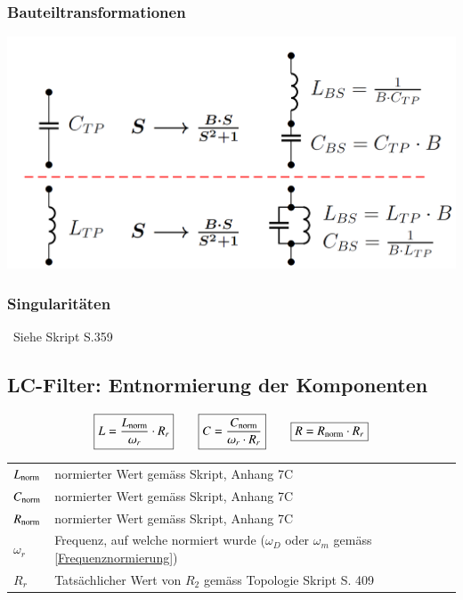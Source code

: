 \begin{minipage}[t]{0.48\columnwidth}
    \subsubsection{Bauteiltransformationen}
    \includegraphics[width=\columnwidth]{images/bauteiltransformation_TP_BS.png}
\end{minipage}
\hfill
\begin{minipage}[t]{0.48\columnwidth}
    \subsubsection{Singularitäten}

    \textrightarrow\ Siehe Skript S.359
\end{minipage}


\subsection{LC-Filter: Entnormierung der Komponenten}
\label{Entnormierung Komponenten}

$$ \boxed{ L = \frac{L_{\rm norm}}{\omega_r} \cdot R_r}
\qquad \boxed{ C = \frac{C_{\rm norm}}{\omega_r \cdot R_r }}
\qquad \boxed{ R = R_{\rm norm} \cdot R_r } $$

\begin{center}
    \begin{tabular}{ll}
        $L_{\rm norm}$  & normierter Wert gemäss Skript, Anhang 7C \\
        $C_{\rm norm}$  & normierter Wert gemäss Skript, Anhang 7C \\
        $R_{\rm norm}$  & normierter Wert gemäss Skript, Anhang 7C \\
        $\omega_r$  & Frequenz, auf welche normiert wurde ($\omega_D$ oder $\omega_m$ gemäss \ref{Frequenznormierung}) \\
        $R_r$       & Tatsächlicher Wert von $R_2$ gemäss Topologie Skript S. 409
    \end{tabular}
\end{center}
    
